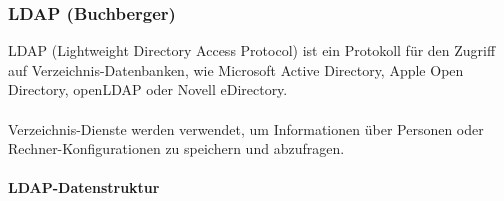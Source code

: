 \subsubsection{LDAP (Buchberger)}

LDAP (Lightweight Directory Access Protocol) ist ein Protokoll für den Zugriff auf Verzeichnis-Datenbanken, wie Microsoft Active Directory, Apple Open Directory, openLDAP oder Novell eDirectory.\\
\\
Verzeichnis-Dienste werden verwendet, um Informationen über Personen oder Rechner-Konfigurationen zu speichern und abzufragen.\\

\paragraph{LDAP-Datenstruktur\\}

